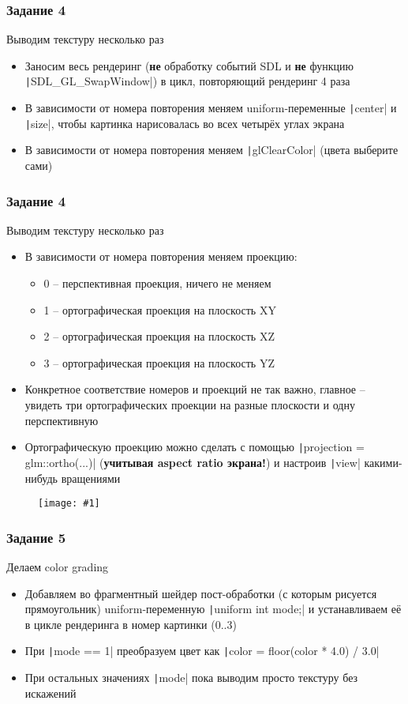 \documentclass[10pt]{beamer}
\newcommand{\slideimage}[1]{
  \begin{figure}
    \begin{adjustbox}{width=\textwidth, totalheight=\textheight-2\baselineskip-2\baselineskip,keepaspectratio}
      \texttt{[image: \#1]}
    \end{adjustbox}
  \end{figure}
}
\begin{document}
\begin{frame}[fragile]
\frametitle{Задание 4}
Выводим текстуру несколько раз
\begin{itemize}
\item Заносим весь рендеринг (\textbf{не} обработку событий SDL и \textbf{не} функцию \texttt|SDL_GL_SwapWindow|) в цикл, повторяющий рендеринг 4 раза
\item В зависимости от номера повторения меняем uniform-переменные \texttt|center| и \texttt|size|, чтобы картинка нарисовалась во всех четырёх углах экрана
\item В зависимости от номера повторения меняем \texttt|glClearColor| (цвета выберите сами)
\end{itemize}
\end{frame}

\begin{frame}[fragile]
\frametitle{Задание 4}
Выводим текстуру несколько раз
\begin{itemize}
\item В зависимости от номера повторения меняем проекцию:
\begin{itemize}
\item 0 -- перспективная проекция, ничего не меняем
\item 1 -- ортографическая проекция на плоскость XY
\item 2 -- ортографическая проекция на плоскость XZ
\item 3 -- ортографическая проекция на плоскость YZ
\end{itemize}
\item Конкретное соответствие номеров и проекций не так важно, главное -- увидеть три ортографических проекции на разные плоскости и одну перспективную
\item Ортографическую проекцию можно сделать с помощью \texttt|projection = glm::ortho(...)| (\textbf{учитывая aspect ratio экрана!}) и настроив \texttt|view| какими-нибудь вращениями
\end{itemize}
\end{frame}

\begin{frame}[fragile]
\slideimage{4.png}
\end{frame}

\begin{frame}[fragile]
\frametitle{Задание 5}
Делаем color grading
\begin{itemize}
\item Добавляем во фрагментный шейдер пост-обработки (с которым рисуется прямоугольник) uniform-переменную \texttt|uniform int mode;| и устанавливаем её в цикле рендеринга в номер картинки (0..3)
\item При \texttt|mode == 1| преобразуем цвет как \texttt|color = floor(color * 4.0) / 3.0|
\item При остальных значениях \texttt|mode| пока выводим просто текстуру без искажений
\end{itemize}
\end{frame}
\end{document}
